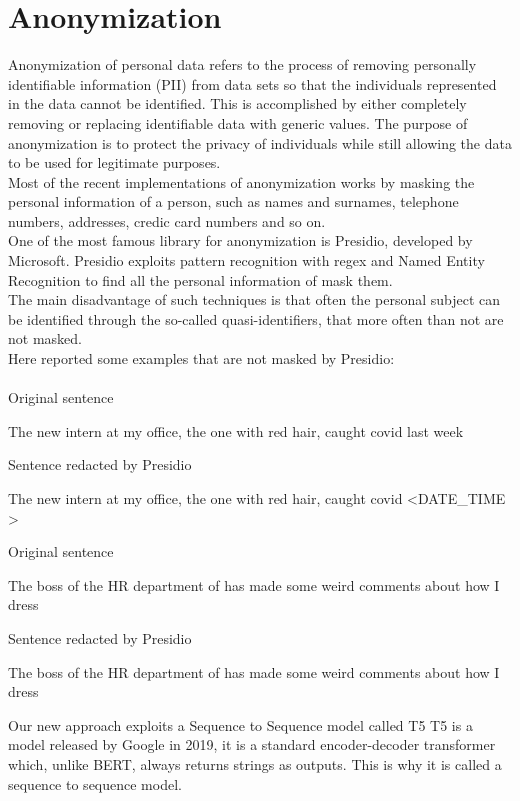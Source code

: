\section{Anonymization}

Anonymization of personal data refers to the process of removing personally identifiable information (PII) from data sets so that the individuals represented in the data cannot be identified. This is accomplished by either completely removing or replacing identifiable data with generic values. The purpose of anonymization is to protect the privacy of individuals while still allowing the data to be used for legitimate purposes. \\
Most of the recent implementations of anonymization works by masking the personal information of a person, such as names and surnames, telephone numbers, addresses, credic card numbers and so on. \\
One of the most famous library for anonymization is Presidio, developed by Microsoft. Presidio exploits pattern recognition with regex and Named Entity Recognition to find all the personal information of mask them. \\
The main disadvantage of such techniques is that often the personal subject can be identified through the so-called quasi-identifiers, that more often than not are not masked.
\\Here reported some examples that are not masked by Presidio:\\ \\
Original sentence
\begin{adjustwidth}{1cm}{}
    The new intern at my office, the one with red hair, caught covid last week 
\end{adjustwidth}
Sentence redacted by Presidio
\begin{adjustwidth}{1cm}{}
    The new intern at my office, the one with red hair, caught covid \textless DATE\_TIME \textgreater
\end{adjustwidth}
Original sentence
\begin{adjustwidth}{1cm}{}
    The boss of the HR department of has made some weird comments about how I dress
\end{adjustwidth}
Sentence redacted by Presidio
\begin{adjustwidth}{1cm}{}
    The boss of the HR department of has made some weird comments about how I dress 
\end{adjustwidth}
Our new approach exploits a Sequence to Sequence model called T5
T5 is a model released by Google in 2019, it is a standard encoder-decoder transformer which, unlike BERT, always returns strings as outputs. This is why it is called a sequence to sequence model. \\

